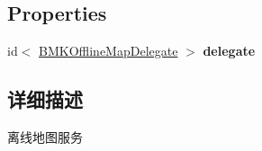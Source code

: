 \subsection*{Properties}
\begin{DoxyCompactItemize}
\item 
\hypertarget{interface_b_m_k_offline_map_ae25b1af7e710b8dbffd88aad3e081f48}{id$<$ \hyperlink{protocol_b_m_k_offline_map_delegate-p}{B\-M\-K\-Offline\-Map\-Delegate} $>$ {\bfseries delegate}}\label{interface_b_m_k_offline_map_ae25b1af7e710b8dbffd88aad3e081f48}

\end{DoxyCompactItemize}


\subsection{详细描述}
离线地图服务 

